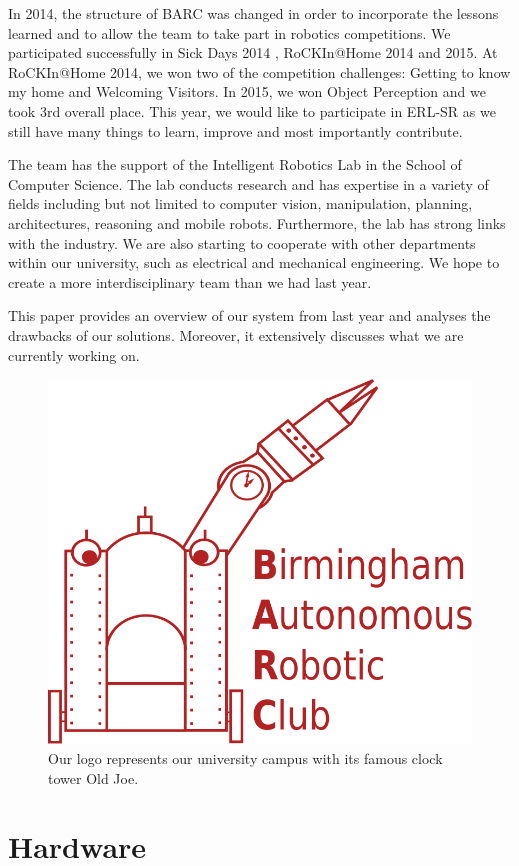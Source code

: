 \documentclass[conference]{IEEEtran}
\begin{document}
In 2014, the structure of BARC was changed in order to incorporate the lessons learned and to allow the team to take part in robotics competitions. We participated successfully in Sick Days 2014 \cite{sick}, RoCKIn@Home 2014 and 2015. At RoCKIn@Home 2014,  we won two of the competition challenges: Getting to know my home and Welcoming Visitors. In 2015, we won Object Perception and we took 3rd overall place. This year, we would like to participate in ERL-SR as we still have many things to learn, improve and most importantly contribute. 

The team has the support of the Intelligent Robotics Lab \cite{irlab} in the School of Computer Science. The lab conducts research and has expertise in a variety of fields including but not limited to computer vision, manipulation, planning, architectures, reasoning and mobile robots. Furthermore, the lab has strong links with the industry. 
We are also starting to cooperate with other departments within our university, such as electrical and mechanical engineering. We hope to create a more interdisciplinary team than we had last year.

This paper provides an overview of our system from last year and analyses the drawbacks of our solutions. Moreover, it extensively discusses what we are currently working on. 


\begin{figure}[!t]
\centering
\includegraphics[width=0.6\columnwidth]{logo_barc.png}
\caption{Our logo represents our university campus with its famous clock tower Old Joe.}
\label{fig:dora}
\end{figure}


\section{\label{sec:hardware}Hardware}

\end{document}
